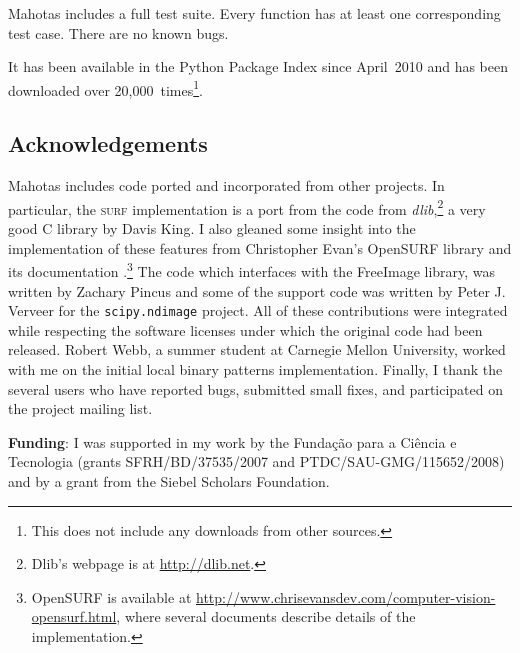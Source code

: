 \documentclass{article}
\newcommand*{\cpp}{{C\nolinebreak[4]\hspace{-.05em}\raisebox{.4ex}{\tiny\textbf{++}}}}
\let\code\texttt
\begin{document}
Mahotas includes a full test suite. Every function has at least one
corresponding test case. There are no known bugs.

It has been available in the Python Package Index since April~2010 and has been
downloaded over 20,000~times\footnote{This does not include any downloads from
other sources.}.

\subsection*{Acknowledgements}

Mahotas includes code ported and incorporated from other projects. In
particular, the \textsc{surf} implementation is a port from the code from
\textit{dlib},\footnote{Dlib's webpage is at \url{http://dlib.net}.} a very
good \cpp{} library by Davis King. I also gleaned some insight into the
implementation of these features from Christopher Evan's OpenSURF library and
its documentation \citep{evans2009}.\footnote{OpenSURF is available at
\url{http://www.chrisevansdev.com/computer-vision-opensurf.html}, where several
documents describe details of the implementation.} The code which interfaces
with the FreeImage library, was written by Zachary Pincus and some of the
support code was written by Peter J. Verveer for the \code{scipy.ndimage}
project. All of these contributions were integrated while respecting the
software licenses under which the original code had been released. Robert Webb,
a summer student at Carnegie Mellon University, worked with me on the initial
local binary patterns implementation. Finally, I thank the several users who
have reported bugs, submitted small fixes, and participated on the project
mailing list.

\textbf{Funding}: I was supported in my work by the Funda\c c\~{a}o para a
Ci\^encia e Tecnologia (grants SFRH/BD/37535/2007 and PTDC/SAU-GMG/115652/2008)
and by a grant from the Siebel Scholars Foundation.

\printbibliography
\end{document}
